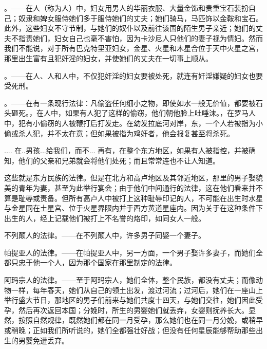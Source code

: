 。——在人（称为人）中，妇女用男人的华丽衣服、大量金饰和贵重宝石装扮自己；奴隶和婢女服侍她们多于服侍她们的丈夫；她们骑马，马匹饰以金鞍和宝石。此外，这些妇女不守节制，与她们的奴仆以及前往该国的陌生男子亲近；她们的丈夫不指责她们，妇女自己也毫不害怕，因为卡沙尼人只他们的妻子视为情妇。然而我们不能说，对于所有巴克特里亚妇女，金星、火星和木星合位于天中火星之宫，那里出生富有且犯奸淫的妇女，并使她们的丈夫在一切事上顺从。\par

。——在人、人和人中，不仅犯奸淫的妇女要被处死，就连有奸淫嫌疑的妇女也要受死刑。\par

。——在有一条现行法律：凡偷盗任何细小之物，即使如水一般无价值，都要被石头砸死。，在人中，如果有人犯了这样的偷窃，他们朝他脸上吐唾沫。，在罗马人中，犯有小偷窃的人被鞭打后打发走。在幼发拉底河对岸，东，一个人若被指为小偷或杀人犯，并不太在意；但如果被指为鸡奸者，他会报复甚至将杀死。\par

.... 在..男孩...给我们，而不... 再有，在整个东方地区，如果有人被指控，并被确知，他们的父亲和兄弟就会将他们处死；而且常常连也不让人知道。\par

这些就是东方民族的法律。但是在北方和高卢地区及其邻近地区，那里的男子娶貌美的青年为妻，甚至为此举行宴会；由于他们中间通行的法律，这在他们看来并不算是耻辱或责备。但所有高卢人中被打上这种耻辱印记的人，不可能在出生时水星与金星同在土星宫、位于火星界限内并于西方黄道星座内。因为关于在这种条件下出生的人，经上记载他们被打上不名誉的烙印，如同女人一般。\par

不列颠人的法律。——在不列颠人中，许多男子同娶一个妻子。\par

帕提亚人的法律。——在帕提亚人中，另一方面，一个男子娶许多妻子，而她们全都只忠于他一个人，因为那个国家在那里制定的法律。\par

阿玛宗人的法律。——至于阿玛宗人，她们全体，整个民族，都没有丈夫；而像动物一样，每年春天，她们从自己的领土出发，渡过河流；过河后，她们在一座山上举行盛大节日，那地区的男子们前来与她们共度十四天，与她们交往，她们因此受孕，然后再次返回本国；分娩时，所生的男婴她们就丢弃，女婴则抚养长大。显然，按照自然规律，既然她们都在同一月受孕，那么她们也在同一月分娩，或稍早或稍晚；正如我们所听说的，她们全都强壮好战；但没有任何星辰能够帮助那些出生的男婴免遭丢弃。\par

